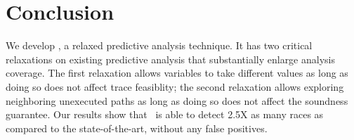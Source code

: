 \section{Conclusion}
We develop \sysname, a relaxed predictive analysis technique. It has two
critical relaxations on existing predictive analysis that substantially
enlarge analysis coverage. The first relaxation allows variables to 
take different values as long as doing so does not affect trace feasiblity;
the second relaxation allows exploring neighboring unexecuted paths as long
as doing so does not affect the soundness guarantee. Our results show that
\sysname\  is able to detect 2.5X as many races as compared to the state-of-the-art,
without any false positives.

%

